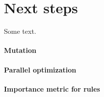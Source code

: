 \section{Next steps}
\label{sec:future}

Some text.

\paragraph{Mutation}

\paragraph{Parallel optimization}

\paragraph{Importance metric for rules}



